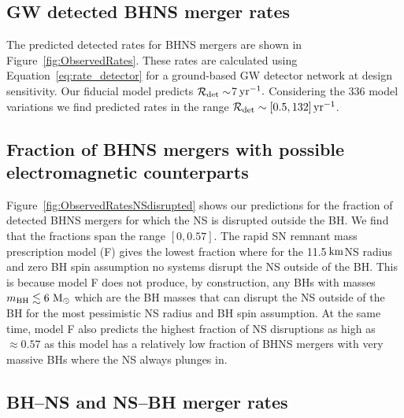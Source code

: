 \documentclass[twocolumn]{aastex63}
\newcommand\rate{\mathcal{R}}
\newcommand\bhnsSingle{BHNS\xspace}
\newcommand\rateObsBHNS{$7$\xspace}
\newcommand{\km}{\ensuremath{\,\rm{km}}\xspace}
\newcommand{\Msun}{\ensuremath{\,\rm{M}_{\odot}}\xspace}
\newcommand{\yearmin}{\ensuremath{\,\rm{yr}^{-1}}\xspace}
\newcommand{\mbhf}{\ensuremath{m_{\rm{BH}}}\xspace}
\newcommand{\Nmodels}{\ensuremath{336}\xspace}
\newcommand{\RateObservedAzeroBHNSmax}{\ensuremath{132}\xspace}
\newcommand{\RateObservedAzeroBHNSmin}{\ensuremath{0.5}\xspace}
\begin{document}
\subsection{GW detected \bhnsSingle merger rates}
\label{subsec:results-variations-rates-observed}
%
The predicted detected  rates for  \bhnsSingle  mergers  are shown in Figure~\ref{fig:ObservedRates}. 
These rates are calculated using Equation~\ref{eq:rate_detector} for a ground-based \ac{GW} detector network at design sensitivity. 
Our fiducial model predicts $\rate_{\rm{det}}  \sim \rateObsBHNS  \yearmin.$ Considering the \Nmodels model variations we find predicted  rates in the range $\rate_{\rm{det}} \sim [\RateObservedAzeroBHNSmin, \RateObservedAzeroBHNSmax]\yearmin$. 


\subsection{Fraction of \bhnsSingle mergers with possible electromagnetic counterparts}
\label{subsec:fraction-BHNS-with-EM-ejecta}
%
Figure~\ref{fig:ObservedRatesNSdisrupted} shows our predictions for the fraction of detected \bhnsSingle mergers for which the \ac{NS} is disrupted outside the \ac{BH}. We find that the fractions span the range $[0, 0.57]$.  
 The rapid \ac{SN} remnant mass prescription model (F)  gives the lowest fraction where for the 11.5\km \ac{NS} radius and zero \ac{BH} spin assumption no systems disrupt the \ac{NS} outside of the \ac{BH}. This is because model F  does not produce, by construction,  any \acp{BH}  with masses  $ \mbhf \lesssim6$\Msun which are the  \ac{BH} masses that can disrupt the \ac{NS} outside of the \ac{BH}  for the most pessimistic \ac{NS} radius and \ac{BH} spin assumption.  At the same time, model F also predicts the highest fraction of \ac{NS} disruptions as high as $\approx 0.57$ as this model has a relatively low fraction
of \bhnsSingle mergers with very massive \acp{BH} where the \ac{NS} always plunges in.


\subsection{BH--NS and NS--BH merger rates}
\label{subsec:fraction-BHNS-with-NSBH}
%
\end{document}
